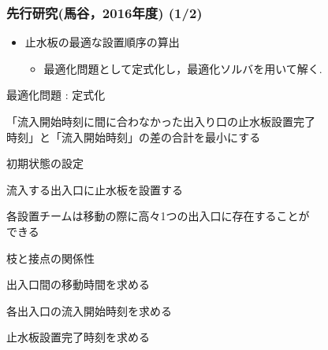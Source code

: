 \documentclass[12pt,dvipdfmx]{beamer}
\begin{document}
    {
      \frametitle{先行研究(馬谷，2016年度) (1/2)}

      \begin{itemize}
      \item 止水板の最適な設置順序の算出
        \begin{itemize}
        \item 最適化問題として定式化し，最適化ソルバを用いて解く.
        \end{itemize}
      \end{itemize}

      \footnotesize
      \begin{beamerboxesrounded}
        {最適化問題 : 定式化}
        \begin{description}
          \footnotesize
        \item [目的関数]「流入開始時刻に間に合わなかった出入り口の止水板設置完了\\時刻」と「流入開始時刻」の差の合計を最小にする
        \item [制約条件1]初期状態の設定
        \item [制約条件2]流入する出入口に止水板を設置する
        \item [制約条件3]各設置チームは移動の際に高々1つの出入口に存在することが\\できる
        \item [制約条件4]枝と接点の関係性
        \item [制約条件5]出入口間の移動時間を求める
        \item [制約条件6]各出入口の流入開始時刻を求める
        \item [制約条件7]止水板設置完了時刻を求める
        \end{description}
      \end{beamerboxesrounded}
      

    }
\end{document}
